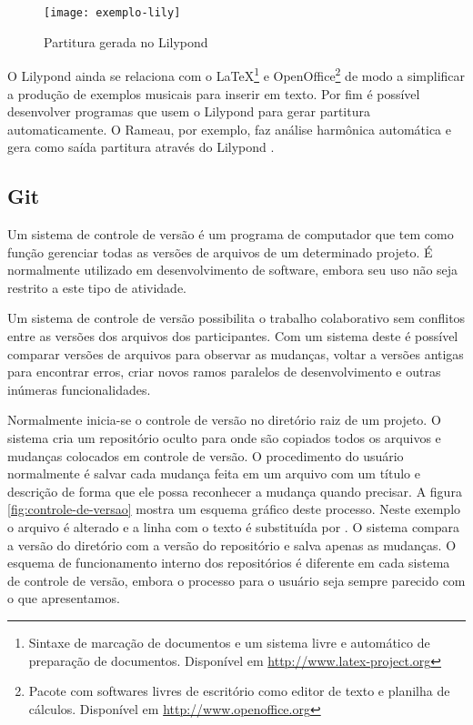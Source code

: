 \begin{figure}[!h]
  \centering
  \texttt{[image: exemplo-lily]}
  \caption{Partitura gerada no Lilypond}
  \label{fig:exemplo-lily}
\end{figure}

O Lilypond ainda se relaciona com o \LaTeX{}\footnote{Sintaxe de
  marcação de documentos e um sistema livre e automático de preparação
  de documentos. Disponível em \url{http://www.latex-project.org}} e
OpenOffice\footnote{Pacote com softwares livres de escritório como
  editor de texto e planilha de cálculos. Disponível em
  \url{http://www.openoffice.org}} de modo a simplificar a produção de
exemplos musicais para inserir em texto. Por fim é possível
desenvolver programas que usem o Lilypond para gerar partitura
automaticamente. O Rameau, por exemplo, faz análise harmônica
automática e gera como saída partitura através do Lilypond
\cite{kroger08:rameau}.

\subsection{Git}
\label{sec:git}

Um sistema de controle de versão é um programa de computador que tem
como função gerenciar todas as versões de arquivos de um determinado
projeto. É normalmente utilizado em desenvolvimento de software,
embora seu uso não seja restrito a este tipo de atividade.

Um sistema de controle de versão possibilita o trabalho colaborativo
sem conflitos entre as versões dos arquivos dos participantes. Com um
sistema deste é possível comparar versões de arquivos para observar as
mudanças, voltar a versões antigas para encontrar erros, criar novos
ramos paralelos de desenvolvimento e outras inúmeras funcionalidades.

Normalmente inicia-se o controle de versão no diretório raiz de um
projeto. O sistema cria um repositório oculto para onde são copiados
todos os arquivos e mudanças colocados em controle de versão. O
procedimento do usuário normalmente é salvar cada mudança feita em um
arquivo com um título e descrição de forma que ele possa reconhecer a
mudança quando precisar. A figura \ref{fig:controle-de-versao} mostra
um esquema gráfico deste processo. Neste exemplo o arquivo 
é alterado e a linha com o texto  é substituída por . O sistema compara a versão do diretório com a versão do
repositório e salva apenas as mudanças. O esquema de funcionamento
interno dos repositórios é diferente em cada sistema de controle de
versão, embora o processo para o usuário seja sempre parecido com o
que apresentamos.

